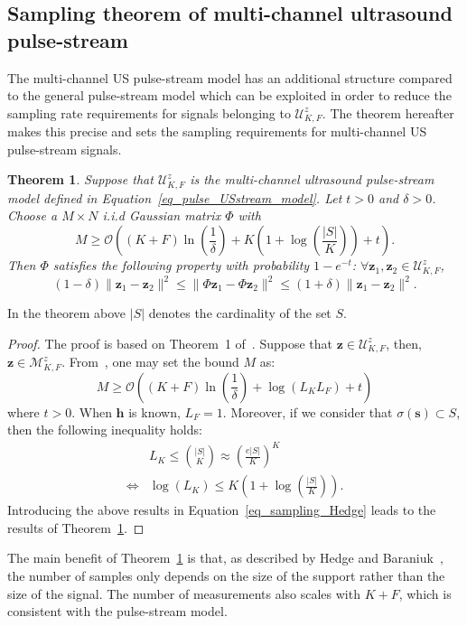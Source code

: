 \documentclass[journal]{IEEEtran}
\newtheorem{theorem}{Theorem}
\newcommand{\vect}[1]{\bm{#1}}
\newcommand{\mat}[1]{\mathsf{#1}}
\theoremstyle{definition}
\begin{document}
\subsection{Sampling theorem of multi-channel ultrasound pulse-stream}
\label{subsec_sampling_pulse_stream}
The multi-channel US pulse-stream model has an additional structure compared to the general pulse-stream model which can be exploited in order to reduce the sampling rate requirements for signals belonging to $\mathcal{U}^z_{K,F}$. The theorem hereafter makes this precise and sets the sampling requirements for multi-channel US pulse-stream signals.
\begin{theorem}
	\label{th_stream_pulse_us}
	Suppose that $\mathcal{U}^z_{K,F}$ is the multi-channel ultrasound pulse-stream model defined in Equation~\eqref{eq_pulse_USstream_model}. Let $t > 0$ and $\delta > 0$. Choose a $M \times N$ i.i.d Gaussian matrix $\mat{\Phi}$ with 
	\begin{equation*}
	M \geq \mathcal{O} \left(\left(K + F\right) \ln \left(\frac{1}{\delta} \right) + K \left( 1 + \log \left(\frac{|S|}{K}\right)\right) + t\right).
	\end{equation*} 
	Then $\mat{\Phi}$ satisfies the following property with probability $1-e^{-t}$: $\forall \vect{z}_1, \vect{z}_2 \in \mathcal{U}^z_{K,F}$, 
	\begin{equation*}
	\left(1- \delta\right) \| \vect{z}_1 - \vect{z}_2\|^2 \leq \| \mat{\Phi} \vect{z}_1 - \mat{\Phi} \vect{z}_2\|^2\leq \left(1+ \delta\right) \| \vect{z}_1 - \vect{z}_2\|^2.
	\end{equation*}
\end{theorem}
In the theorem above $|S|$ denotes the cardinality of the set $S$.
\begin{proof}
	The proof is based on Theorem~\num{1} of~\cite{Hedge_TSP_2011}. Suppose that $\vect{z} \in \mathcal{U}^z_{K,F}$, then, $\vect{z} \in \mathcal{M}^z_{K,F}$. From~\cite{Hedge_TSP_2011}, one may set the bound $M$ as:
	\begin{equation}
		\label{eq_sampling_Hedge}
		M \geq \mathcal{O} \left(\left(K + F\right) \ln \left(\frac{1}{\delta}\right) + \log \left(L_K L_F\right) + t\right)
	\end{equation} 
	where $t > 0$. When $\vect{h}$ is known, $L_F = 1$. Moreover, if we consider that $\sigma \left(\vect{s}\right) \subset S$, then the following inequality holds:
	\begin{align*}
		&L_K \leq {{|S|}\choose{K}} \approx \left(\frac{e|S|}{K}\right)^K \\
		\Leftrightarrow & \log \left(L_K\right) \leq K \left(1 + \log\left(\frac{|S|}{K}\right)\right).
	\end{align*}
	Introducing the above results in Equation~\eqref{eq_sampling_Hedge} leads to the results of Theorem~\ref{th_stream_pulse_us}.
\end{proof}
The main benefit of Theorem~\ref{th_stream_pulse_us} is that, as described by Hedge and Baraniuk~\cite{Hedge_TSP_2011}, the number of samples only depends on the size of the support rather than the size of the signal. The number of measurements also scales with $K+F$, which is consistent with the pulse-stream model.
\end{document}
